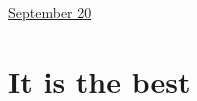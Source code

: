 \documentclass[11pt,letterpaper]{article}
\begin{document}
\href{run:2025-09-20-best.tex}{\Huge September 20} %

\section{It is the best} 


 
\end{document}
